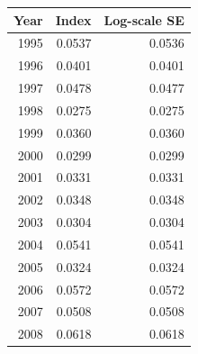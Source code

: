 \documentclass[12pt,]{article}
\begin{document}
\begin{table}[ht]
\begin{tabular}{rrr}
Year & Index & Log-scale SE \\ 
  \hline
 1995 & 0.0537 & 0.0536 \\ 
   1996 & 0.0401 & 0.0401 \\ 
   1997 & 0.0478 & 0.0477 \\ 
   1998 & 0.0275 & 0.0275 \\ 
   1999 & 0.0360 & 0.0360 \\ 
   2000 & 0.0299 & 0.0299 \\ 
   2001 & 0.0331 & 0.0331 \\ 
   2002 & 0.0348 & 0.0348 \\ 
   2003 & 0.0304 & 0.0304 \\ 
   2004 & 0.0541 & 0.0541 \\ 
   2005 & 0.0324 & 0.0324 \\ 
   2006 & 0.0572 & 0.0572 \\ 
   2007 & 0.0508 & 0.0508 \\ 
   2008 & 0.0618 & 0.0618 \\ 
   \hline
\end{tabular}
\end{table}

\FloatBarrier
\end{document}
